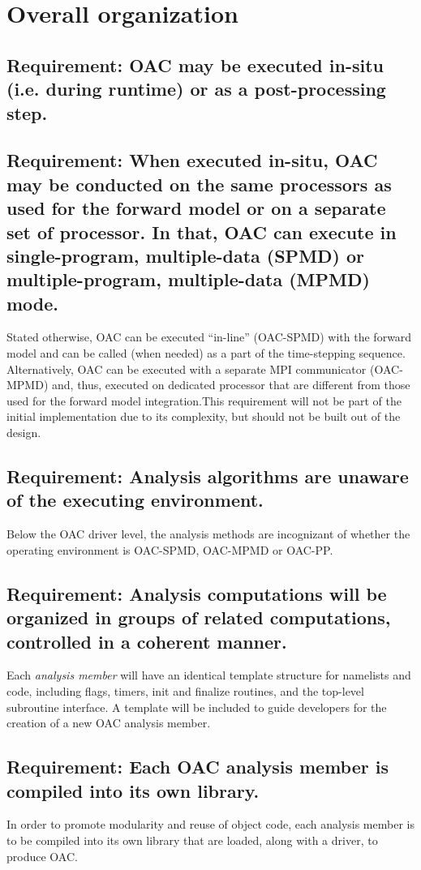 \documentclass[11pt]{report}
\begin{document}
\section{Overall organization}
\subsection{{\color{green} Requirement:} OAC may be executed in-situ (i.e. during runtime) or as a post-processing step.}

\subsection{{\color{green} Requirement:} When executed in-situ, OAC may be conducted on the same processors as used for the forward model or on a separate set of processor. In that, OAC can execute in single-program, multiple-data (SPMD) or multiple-program, multiple-data (MPMD) mode.}
Stated otherwise, OAC can be executed ``in-line'' (OAC-SPMD) with the forward model and can be called (when needed) as a part of the time-stepping sequence. Alternatively, OAC can be executed with a separate MPI communicator (OAC-MPMD) and, thus, executed on dedicated processor that are different from those used for the forward model integration.This requirement will not be part of the initial implementation due to its complexity, but should not be built out of the design.

\subsection{{\color{green} Requirement:} Analysis algorithms are unaware of the executing environment.}
Below the OAC driver level, the analysis methods are incognizant of whether the operating environment is OAC-SPMD, OAC-MPMD or OAC-PP.

\subsection{{\color{green} Requirement:} Analysis computations will be organized in groups of related computations, controlled in a coherent manner.}
Each {\it analysis member} will have an identical template structure for namelists and code, including flags, timers, init and finalize routines, and the top-level subroutine interface. A template will be included to guide developers for the creation of a new OAC analysis member.

\subsection{{\color{red} Requirement:} Each OAC analysis member is compiled into its own library.}
In order to promote modularity and reuse of object code, each analysis member is to be compiled into its own library that are loaded, along with a driver, to produce OAC.
\end{document}
